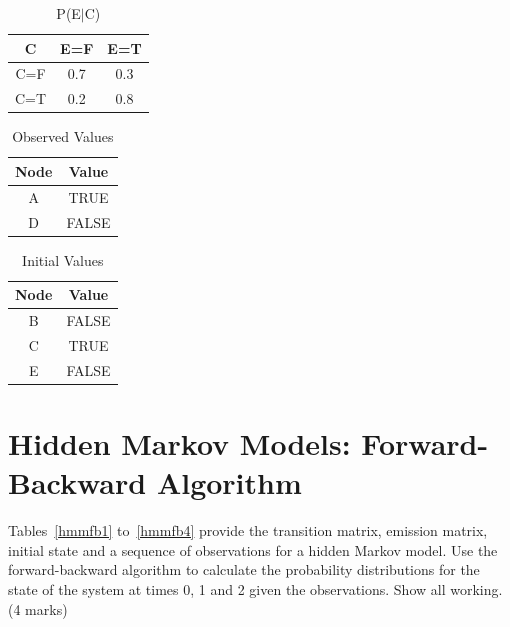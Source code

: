\documentclass{article}
\begin{document}
\begin{table}[h!]
\caption{P(E$|$C)}
\label{MCMC5}
\begin{center}
\begin{tabular}{ |c||c|c| } 
\hline
 C & E=F & E=T\\
\hline
 C=F & 0.7 & 0.3\\
 C=T & 0.2 & 0.8\\
\hline
\end{tabular}
\end{center}
\end{table}
\begin{table}[h!]
\caption{Observed Values}
\label{MCMC6}
\begin{center}
\begin{tabular}{ |c|c| } 
\hline
 Node & Value \\
\hline
A & TRUE\\
D & FALSE\\
\hline
\end{tabular}
\end{center}
\end{table}
\begin{table}[h!]
\caption{Initial Values}
\label{MCMC7}
\begin{center}
\begin{tabular}{ |c|c| } 
\hline
 Node  & Value \\
\hline
B & FALSE\\
C & TRUE\\
E & FALSE\\
\hline
\end{tabular}
\end{center}
\end{table}
\clearpage
\section{Hidden Markov Models: Forward-Backward Algorithm}

Tables~\ref{hmmfb1} to~\ref{hmmfb4} provide the transition matrix, emission matrix, initial state and a sequence of observations for a hidden Markov model. Use the forward-backward algorithm to calculate the probability distributions for the state of the system at times 0, 1 and 2 given the observations. Show all working. (4 marks)
\end{document}
